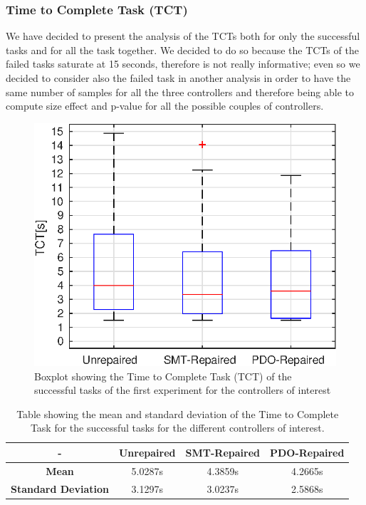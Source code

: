\subsubsection{Time to Complete Task (TCT)}\label{subsub:first-TCT}
We have decided to present the analysis of the TCTs both for only the successful tasks and for all the task together. We decided to do so because the TCTs of the failed tasks saturate at 15 seconds, therefore is not really informative; even so we decided to consider also the failed task in another analysis in order to have the same number of samples for all the three controllers and therefore being able to compute size effect and p-value for all the possible couples of controllers.
\begin{figure}[H]
    \centering
    \includegraphics[width=\textwidth]{Images/first-experiment/exp0_TCT_succ.eps}
    \caption{Boxplot showing the Time to Complete Task (TCT) of the successful tasks of the first experiment for the controllers of interest}
    \label{fig:box-TCT-succ-first}
\end{figure}
\begin{table}[H]
    \centering
    \begin{tabular}{|c|c|c|c|}
        \hline
        - & \textbf{Unrepaired} & \textbf{SMT-Repaired} & \textbf{PDO-Repaired} \\
        \hline
        \textbf{Mean} & 5.0287s & 4.3859s & 4.2665s \\
        \textbf{Standard Deviation} & 3.1297s & 3.0237s & 2.5868s \\
        \hline
    \end{tabular}
    \caption{Table showing the mean and standard deviation of the Time to Complete Task for the successful tasks for the different controllers of interest.}
    \label{tab:TCT-succ-first-mean-std}
\end{table}
